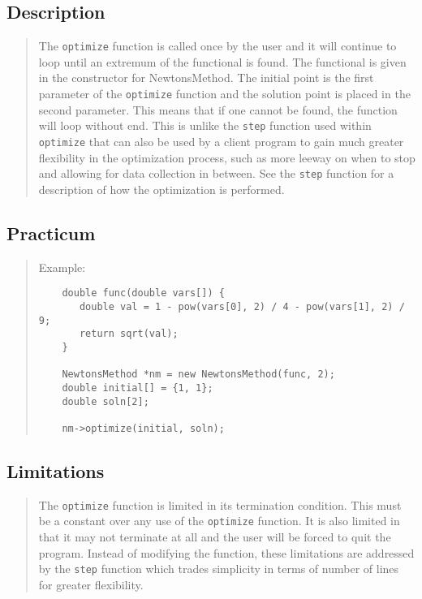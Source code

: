 \documentclass[10pt]{article}%
\begin{document}
\subsection*{Description}

\begin{quotation} The \texttt{optimize} function is called once by the user and it will continue to loop until an extremum of the functional is found. The functional is given in the constructor for NewtonsMethod. The initial point is the first parameter of the \texttt{optimize} function and the solution point is placed in the second parameter. This means that if one cannot be found, the function will loop without end. This is unlike the \texttt{step} function used within \texttt{optimize} that can also be used by a client program to gain much greater flexibility in the optimization process, such as more leeway on when to stop and allowing for data collection in between. See the \texttt{step} function for a description of how the optimization is performed.\end{quotation}

\subsection*{Practicum}

\begin{quotation} Example:{\small{\begin{verbatim} 
    double func(double vars[]) {
       double val = 1 - pow(vars[0], 2) / 4 - pow(vars[1], 2) / 9;
       return sqrt(val);
    }
    
    NewtonsMethod *nm = new NewtonsMethod(func, 2);
    double initial[] = {1, 1};
    double soln[2];

    nm->optimize(initial, soln);
  \end{verbatim}
}}
\end{quotation}
\subsection*{Limitations}

\begin{quotation} The \texttt{optimize} function is limited in its termination condition. This must be a constant over any use of the \texttt{optimize} function. It is also limited in that it may not terminate at all and the user will be forced to quit the program. Instead of modifying the function, these limitations are addressed by the \texttt{step} function which trades simplicity in terms of number of lines for greater flexibility.\end{quotation}
\end{document}
